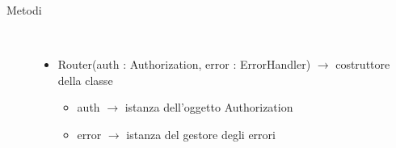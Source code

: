 \begin{description}
\item[Metodi] \hfill \\
\vspace{-7mm}
\begin{itemize}
	\item Router(auth : Authorization, error : ErrorHandler) $\rightarrow$ costruttore della classe\begin{itemize}
		\item auth $\rightarrow$ istanza dell'oggetto Authorization
		\item error $\rightarrow$ istanza del gestore degli errori
	\end{itemize}
	
\end{itemize}

\end{description}

\vspace{0.5cm}
\hypertarget{server::middleware::Authorization}{}
